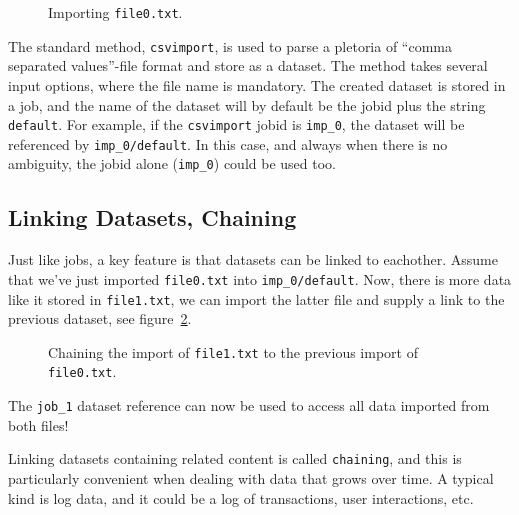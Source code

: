 \documentclass[a4paper]{article}
\begin{document}
\begin{figure}[h!]
  \begin{center}
    
    \caption{Importing \texttt{file0.txt}.}
    \label{fig:dataset_csvimport}
  \end{center}
\end{figure}

\noindent The standard method, \texttt{csvimport}, is used to parse a
pletoria of ``comma separated values''-file format and store as a
dataset.  The method takes several input options, where the file name
is mandatory.  The created dataset is stored in a job, and the name of
the dataset will by default be the jobid plus the string
\texttt{default}.  For example, if the \texttt{csvimport} jobid is
\texttt{imp\_0}, the dataset will be referenced by
\texttt{imp\_0/default}.  In this case, and always when there is no
ambiguity, the jobid alone (\texttt{imp\_0}) could be used too.

\clearpage




\subsection{Linking Datasets, Chaining}

Just like jobs, a key feature is that datasets can be linked to
eachother.  Assume that we've just imported \texttt{file0.txt} into
\texttt{imp\_0/default}.  Now, there is more data like it stored in
\texttt{file1.txt}, we can import the latter file and supply a link to
the previous dataset, see figure~\ref{fig:dataset_csvimport_chain}.

\begin{figure}[h!]
  \begin{center}
    
    \caption{Chaining the import of \texttt{file1.txt} to the previous
      import of \texttt{file0.txt}.}
    \label{fig:dataset_csvimport_chain}
  \end{center}
\end{figure}

\noindent The \texttt{job\_1} dataset reference can now be used to
access all data imported from both files!

Linking datasets containing related content is called
\texttt{chaining}, and this is particularly convenient when dealing
with data that grows over time.  A typical kind is log data, and it
could be a log of transactions, user interactions, etc.
\end{document}
